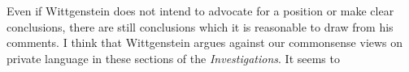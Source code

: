 \documentclass[doc,12pt,apacite,biblatex]{apa6}
\begin{document}
Even if Wittgenstein does not intend to advocate for a position or make clear
conclusions, there are still conclusions which it is reasonable to draw from
his comments. I think that Wittgenstein argues against our commonsense views
%
%
on private language in these sections of the \emph{Investigations}. It seems to
\end{document}
